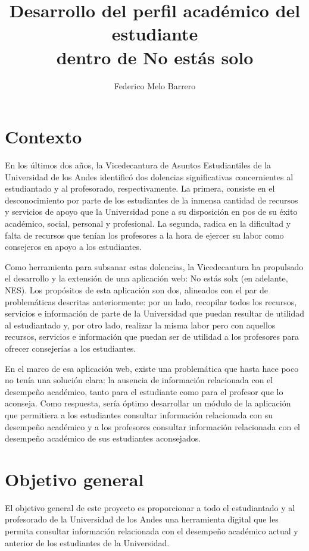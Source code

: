 \documentclass{fmb-proposal}
\title{Desarrollo del perfil académico del estudiante\\dentro de No estás solo}
\author{Federico Melo Barrero\inst{1}}
\begin{document}
\maketitle

\section{Contexto}

En los últimos dos años, la Vicedecantura de Asuntos Estudiantiles de la Universidad de los Andes identificó dos dolencias significativas concernientes al estudiantado y al profesorado, respectivamente. La primera, consiste en el desconocimiento por parte de los estudiantes de la inmensa cantidad de recursos y servicios de apoyo que la Universidad pone a su disposición en pos de su éxito académico, social, personal y profesional. La segunda, radica en la dificultad y falta de recursos que tenían los profesores a la hora de ejercer su labor como consejeros en apoyo a los estudiantes.

Como herramienta para subsanar estas dolencias, la Vicedecantura ha propulsado el desarrollo y la extensión de una aplicación web: No estás solx (en adelante, NES). Los propósitos de esta aplicación son dos, alineados con el par de problemáticas descritas anteriormente: por un lado, recopilar todos los recursos, servicios e información de parte de la Universidad que puedan resultar de utilidad al estudiantado y, por otro lado, realizar la misma labor pero con aquellos recursos, servicios e información que puedan ser de utilidad a los profesores para ofrecer consejerías a los estudiantes.

En el marco de esa aplicación web, existe una problemática que hasta hace poco no tenía una solución clara: la ausencia de información relacionada con el desempeño académico, tanto para el estudiante como para el profesor que lo aconseja. Como respuesta, sería óptimo desarrollar un módulo de la aplicación que permitiera a los estudiantes consultar información relacionada con su desempeño académico y a los profesores consultar información relacionada con el desempeño académico de sus estudiantes aconsejados.


\section{Objetivo general}

El objetivo general de este proyecto es proporcionar a todo el estudiantado y al profesorado de la Universidad de los Andes una herramienta digital que les permita consultar información relacionada con el desempeño académico actual y anterior de los estudiantes de la Universidad.
\end{document}
